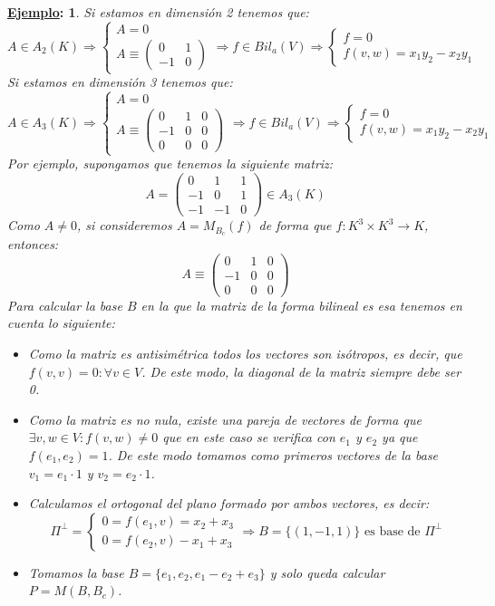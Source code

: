 \documentclass[10pt,a4paper,openright]{book}
\theoremstyle{break}
\newtheorem*{ej}{\underline{Ejemplo}:}
\begin{document}
\begin{ej}
Si estamos en dimensión 2 tenemos que:
$$A\in A_2(K)\Rightarrow\begin{cases} A = 0 \\ A\equiv \begin{pmatrix} 0 & 1\\ -1 & 0\end{pmatrix}\end{cases}\Rightarrow f\in Bil_a(V)\Rightarrow \begin{cases} f = 0 \\ f(v,w) = x_1y_2-x_2y_1 \end{cases}$$
Si estamos en dimensión 3 tenemos que:
$$A\in A_3(K)\Rightarrow\begin{cases} A = 0 \\ A\equiv \begin{pmatrix} 0 & 1 & 0\\ -1 & 0 & 0 \\ 0 & 0 & 0 \end{pmatrix}\end{cases}\Rightarrow f\in Bil_a(V)\Rightarrow \begin{cases} f = 0 \\ f(v,w) = x_1y_2-x_2y_1 \end{cases}$$
Por ejemplo, supongamos que tenemos la siguiente matriz:
$$A= \begin{pmatrix} 0 & 1 & 1 \\ -1 & 0 & 1 \\ -1 & -1 & 0\end{pmatrix}\in A_3(K)$$
Como $A\neq 0$, si consideremos $A=M_{B_c}(f)$ de forma que $f: K^3\times K^3\rightarrow K$, entonces:
$$A \equiv \begin{pmatrix} 0 & 1 & 0 \\ -1 & 0 & 0 \\ 0 & 0 & 0\end{pmatrix}$$
Para calcular la base $B$ en la que la matriz de la forma bilineal es esa tenemos en cuenta lo siguiente:
\begin{itemize}
\item  Como la matriz es antisimétrica todos los vectores son isótropos, es decir, que $f(v,v)=0: \forall v\in V$. De este modo, la diagonal de la matriz siempre debe ser 0.
\item Como la matriz es no nula, existe una pareja de vectores de forma que $\exists v,w\in V: f(v,w)\neq 0$ que en este caso se verifica con $e_1$ y $e_2$ ya que $f(e_1,e_2)=1$. De este modo tomamos como primeros vectores de la base $v_1= e_1\cdot 1$ y $v_2 = e_2\cdot 1$.
\item  Calculamos el ortogonal del plano formado por ambos vectores, es decir:
$$\Pi^\perp = \begin{cases} 0 = f(e_1,v) = x_2+ x_3 \\ 0= f(e_2,v)-x_1+x_3\end{cases}\Rightarrow B = \{(1,-1,1)\}\mbox{ es base de }\Pi^\perp$$
\item Tomamos la base $B=\{e_1,e_2, e_1-e_2+e_3\}$ y solo queda calcular $P=M(B,B_c)$.
\end{itemize}
\end{ej}
\end{document}
